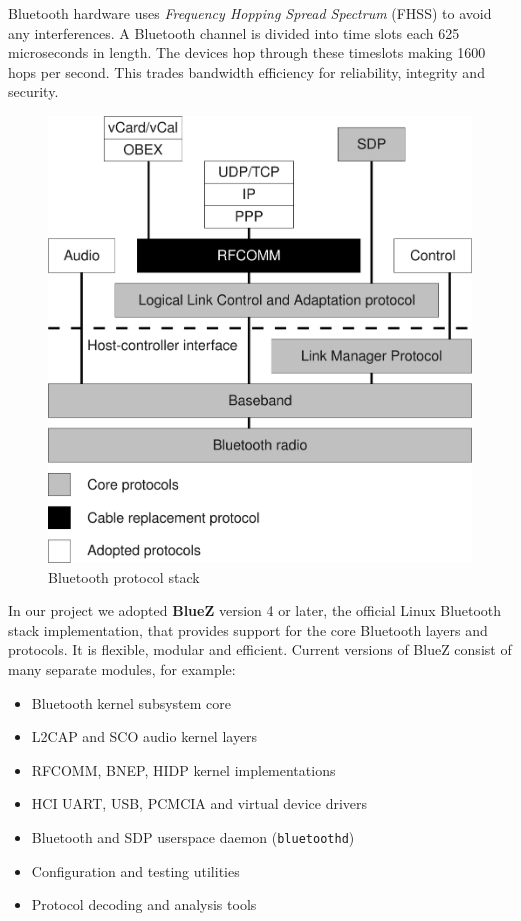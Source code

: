 \documentclass[conference]{IEEEtran}
\begin{document}
Bluetooth hardware uses \textit{Frequency Hopping Spread Spectrum} (FHSS) to avoid any interferences. A Bluetooth channel is divided into time slots each 625 microseconds in length. The devices hop through these timeslots making 1600 hops per second. This trades bandwidth efficiency for reliability, integrity and security.

\begin{figure}[h]
\centering
\includegraphics[width=0.9\columnwidth]{BTstack}
\caption{Bluetooth protocol stack}
\label{btstack}
\end{figure}

In our project we adopted \textbf{BlueZ} version 4 or later, the official Linux Bluetooth stack implementation, that provides support for the core Bluetooth layers and protocols. It is flexible, modular and efficient. Current versions of BlueZ consist of many separate modules, for example:
\begin{itemize}
\item Bluetooth kernel subsystem core
\item L2CAP and SCO audio kernel layers
\item RFCOMM, BNEP, HIDP kernel implementations
\item HCI UART, USB, PCMCIA and virtual device drivers
\item Bluetooth and SDP userspace daemon (\texttt{bluetoothd})
\item Configuration and testing utilities
\item Protocol decoding and analysis tools
\end{itemize}
\end{document}
